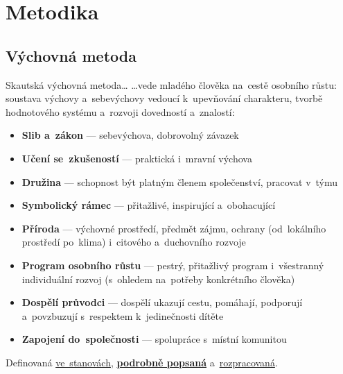 \documentclass[compress, ucs, xelatex, 11pt, xcolor=dvipsnames, print, aspectratio=169,
	hyperref={
		bookmarks=true,
		unicode=true,
		colorlinks=true,
		pdftitle={Skautska vychovna metoda},
		plainpages=false,
		pdfauthor={Vojtech Zeisek},
		pdfsubject={Skautska vychovna metoda a jeji vyvoj za posledni stoleti a desetileti},
		pdfcreator={XeLaTeX},
		pdfkeywords={Junak, Pedagogika, Skaut, Skauting, Vychovna metoda},
		linkcolor=Red, %
		anchorcolor=ForestGreen, %
		citecolor=ForestGreen, %
		filecolor=ForestGreen, %
		menucolor=ForestGreen, %
		urlcolor=Sepia, %
		pdftex},
	url={hyphens, lowtilde} %
	]{beamer}
\begin{document}
\section{Metodika}

\subsection{Výchovná metoda}

\begin{frame}{Skautská výchovná metoda\ldots}
	\ldots vede mladého člověka na~cestě osobního růstu: soustava výchovy a~sebevýchovy vedoucí k~upevňování charakteru, tvorbě hodnotového systému a~rozvoji dovedností a~znalostí:
	\begin{itemize}
		\item \textbf{Slib a~zákon} --- sebevýchova, dobrovolný závazek
		\item \textbf{Učení se~zkušeností} --- praktická i~mravní výchova
		\item \textbf{Družina} --- schopnost být platným členem společenství, pracovat v~týmu
		\item \textbf{Symbolický rámec} --- přitažlivé, inspirující a~obohacující
		\item \textbf{Příroda} --- výchovné prostředí, předmět zájmu, ochrany (od~lokálního prostředí po~klima) i~citového a~duchovního rozvoje
		\item \textbf{Program osobního růstu} --- pestrý, přitažlivý program i~všestranný individuální rozvoj (s~ohledem na~potřeby konkrétního člověka)
		\item \textbf{Dospělí průvodci} --- dospělí ukazují cestu, pomáhají, podporují a~povzbuzují s~respektem k~jedinečnosti dítěte
		\item \textbf{Zapojení do~společnosti} --- spolupráce s~místní komunitou
	\end{itemize}
	Definovaná \href{https://krizovatka.skaut.cz/spisovna/stanovy-junaka-ceskeho-skauta}{ve~stanovách}, \href{https://krizovatka.skaut.cz/vedu-oddil/skautska-vychova/skautska-vychovna-metoda}{\textbf{podrobně popsaná}} a~\href{https://krizovatka.skaut.cz/vedu-oddil/skautska-vychova}{rozpracovaná}.
\end{frame}
\end{document}
